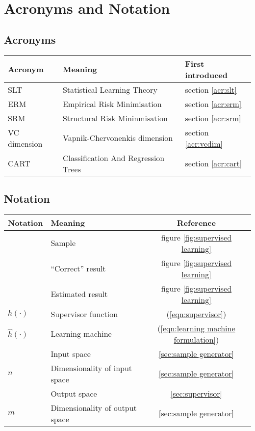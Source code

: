 
\chapter{Acronyms and Notation}

\section*{Acronyms}

\begin{tabular}{l l l}

\bf{Acronym} & \bf{Meaning} & \bf{First introduced} \\ \hline \hline

SLT	& Statistical Learning Theory 	& section \ref{acr:slt} \\
ERM	& Empirical Risk Minimisation 	& section \ref{acr:erm} \\
SRM	& Structural Risk Mininmisation & section \ref{acr:srm} \\
VC dimension & Vapnik-Chervonenkis dimension & section \ref{acr:vcdim} \\
CART	& Classification And Regression Trees & section \ref{acr:cart} \\
\hline

\end{tabular}

\section*{Notation}

\begin{tabular}{l l c}

\bf{Notation}		& \bf{Meaning}		& \bf{Reference} \\
\hline \hline
\bfx		& Sample	& figure \ref{fig:supervised learning} \\
\bfy		& ``Correct'' result & figure \ref{fig:supervised learning} \\
\bfyh		& Estimated result & figure \ref{fig:supervised learning} \\
$h(\cdot)$	& Supervisor function & (\ref{eqn:supervisor}) \\
$\hat{h}(\cdot)$& Learning machine & (\ref{eqn:learning machine formulation})\\
\calI		& Input space & \ref{sec:sample generator} \\
$n$		& Dimensionality of input space & \ref{sec:sample generator} \\
\calO		& Output space & \ref{sec:supervisor} \\
$m$		& Dimensionality of output space & \ref{sec:sample generator}\\
\hline
\end{tabular}
